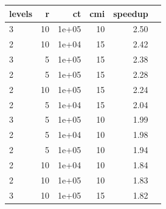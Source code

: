 \begin{tabular}{l|rrrrr}
\hline
levels & r & ct & cmi & speedup \\
\hline
3 & 10 & 1e+05 & 10 & 2.50 \\
2 & 10 & 1e+04 & 15 & 2.42 \\
3 & 5 & 1e+05 & 15 & 2.38 \\
2 & 5 & 1e+05 & 15 & 2.28 \\
2 & 10 & 1e+05 & 15 & 2.24 \\
2 & 5 & 1e+04 & 15 & 2.04 \\
3 & 5 & 1e+05 & 10 & 1.99 \\
2 & 5 & 1e+04 & 10 & 1.98 \\
2 & 5 & 1e+05 & 10 & 1.94 \\
2 & 10 & 1e+04 & 10 & 1.84 \\
2 & 10 & 1e+05 & 10 & 1.83 \\
3 & 10 & 1e+05 & 15 & 1.82 \\
\hline
\end{tabular}
